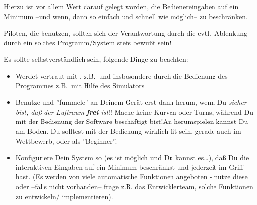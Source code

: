 Hierzu ist vor allem Wert darauf gelegt worden, die Bedienereingaben auf ein Minimum --und wenn, dann so einfach und
schnell wie möglich-- zu beschränken.

Piloten, die  \xc benutzen, sollten sich der Verantwortung durch die evtl.\ Ablenkung durch ein solches Programm/System stets bewußt sein!

Es sollte selbstverständlich sein, folgende Dinge zu beachten:
\begin{itemize}
\item Werdet vertraut mit \xc, z.B.\ und insbesondere durch die Bedienung des Programmes z.B.\ mit Hilfe des Simulators
\item Benutze und ''fummele'' an Deinem Gerät erst dann herum, wenn Du {\sl sicher bist, daß der Luftraum {\bf frei} ist}!!
Mache keine Kurven oder Turns, während Du mit der Bedienung der Software beschäftigt bist!An \xc herumspielen kannst Du am Boden.
Du solltest mit der Bedienung wirklich fit sein, gerade auch im Wettbewerb, oder als ''Beginner''.
\item Konfiguriere Dein System so (es ist möglich und Du kannst es\dots), daß Du die interaktiven Eingaben auf ein Minimum beschränkst und
jederzeit im Griff hast. (Es werden von \xc viele automatische Funktionen angeboten - nutze diese oder --falls nicht vorhanden--
frage z.B. das Entwicklerteam,  solche Funktionen zu entwickeln/ implementieren).
\end{itemize}
